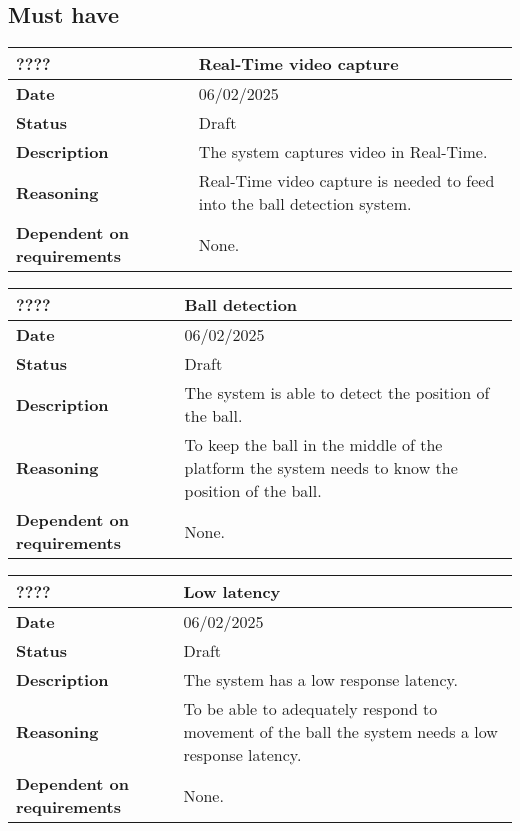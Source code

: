 \documentclass{article}
\begin{document}
\subsection{Must have}


\begin{table}[H]
    \renewcommand{\arraystretch}{1.3}
    \begin{tabular}{|l|p{10cm}|}
        \hline
        \rowcolor{gray!50}
        \textbf{????} & \textbf{Real-Time video capture} \\ \hline
        \textbf{Date} & 06/02/2025 \\ \hline
        \textbf{Status} & Draft \\ \hline
        \textbf{Description} & The system captures video in Real-Time. \\ \hline
        \textbf{Reasoning} & Real-Time video capture is needed to feed into the ball detection system. \\ \hline
        \textbf{Dependent on requirements} & None. \\ \hline
    \end{tabular}
\end{table}

\begin{table}[H]
    \renewcommand{\arraystretch}{1.3}
    \begin{tabular}{|l|p{10cm}|}
        \hline
        \rowcolor{gray!50}
        \textbf{????} & \textbf{Ball detection} \\ \hline
        \textbf{Date} & 06/02/2025 \\ \hline
        \textbf{Status} & Draft \\ \hline
        \textbf{Description} & The system is able to detect the position of the ball. \\ \hline
        \textbf{Reasoning} & To keep the ball in the middle of the platform the system needs to know the position of the ball. \\ \hline
        \textbf{Dependent on requirements} & None. \\ \hline
    \end{tabular}
\end{table}

\begin{table}[H]
    \renewcommand{\arraystretch}{1.3}
    \begin{tabular}{|l|p{10cm}|}
        \hline
        \rowcolor{gray!50}
        \textbf{????} & \textbf{Low latency} \\ \hline
        \textbf{Date} & 06/02/2025 \\ \hline
        \textbf{Status} & Draft \\ \hline
        \textbf{Description} & The system has a low response latency. \\ \hline
        \textbf{Reasoning} & To be able to adequately respond to movement of the ball the system needs a low response latency. \\ \hline
        \textbf{Dependent on requirements} & None. \\ \hline
    \end{tabular}
\end{table}
\end{document}

